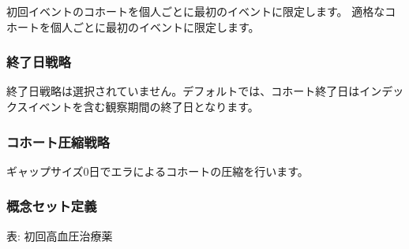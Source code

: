 \documentclass[
  11pt]{book}
\theoremstyle{definition}
\theoremstyle{definition}
\theoremstyle{definition}
\theoremstyle{definition}
\theoremstyle{remark}
\begin{document}
初回イベントのコホートを個人ごとに最初のイベントに限定します。
適格なコホートを個人ごとに最初のイベントに限定します。

\subsubsection*{終了日戦略}\label{ux7d42ux4e86ux65e5ux6226ux7565-2}

終了日戦略は選択されていません。デフォルトでは、コホート終了日はインデックスイベントを含む観察期間の終了日となります。

\subsubsection*{コホート圧縮戦略}\label{ux30b3ux30dbux30fcux30c8ux5727ux7e2eux6226ux7565}

ギャップサイズ0日でエラによるコホートの圧縮を行います。

\subsubsection*{概念セット定義}\label{ux6982ux5ff5ux30bbux30c3ux30c8ux5b9aux7fa9}

表: \label{tab:HTN1yrFO1stLine} 初回高血圧治療薬
\end{document}
